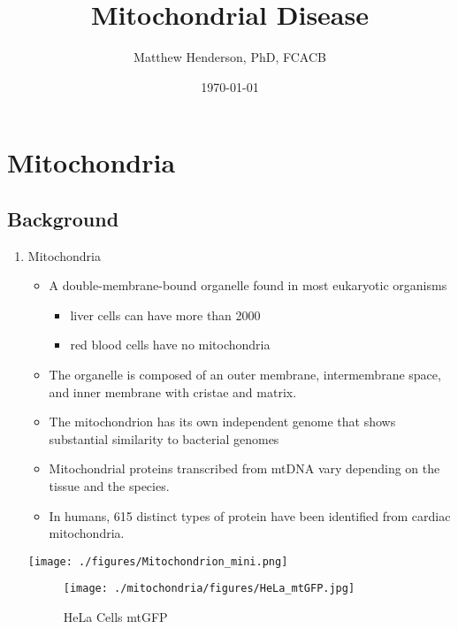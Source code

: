 \documentclass{scrartcl}
\author{Matthew Henderson, PhD, FCACB}
\date{\today}
\title{Mitochondrial Disease}
\begin{document}
\maketitle
\tableofcontents


\section{Mitochondria}
\label{sec:org039e61d}
\subsection{Background}
\label{sec:org534db9f}
\begin{enumerate}
\item Mitochondria
\label{sec:orga55badf}
\begin{itemize}
\item A double-membrane-bound organelle found in most eukaryotic organisms
\begin{itemize}
\item liver cells can have more than 2000
\item red blood cells have no mitochondria
\end{itemize}

\item The organelle is composed of an outer membrane, intermembrane
space, and inner membrane with cristae and matrix.

\item The mitochondrion has its own independent genome that shows
substantial similarity to bacterial genomes

\item Mitochondrial proteins transcribed from mtDNA vary depending on the
tissue and the species.

\item In humans, 615 distinct types of protein have been identified from
cardiac mitochondria.
\end{itemize}

\begin{center}
\texttt{[image: ./figures/Mitochondrion\_mini.png]}
\end{center}


\begin{figure}[htbp]
\centering
\texttt{[image: ./mitochondria/figures/HeLa\_mtGFP.jpg]}
\caption[hela]{\label{fig:org04fae06}
HeLa Cells mtGFP}
\end{figure}


\end{enumerate}
\end{document}
